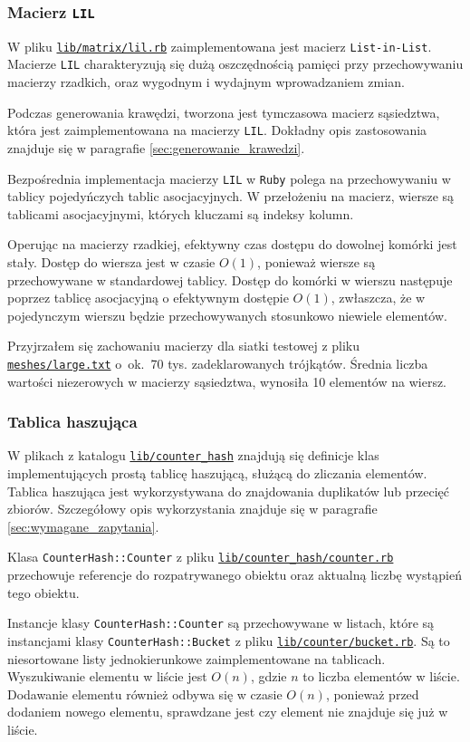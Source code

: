 \documentclass[10pt,a4paper]{article}
\newcommand{\f}[1]{\texttt{#1}}
\newcommand{\rev}{754330aa66a33e7434e6bda5c083aa3e12b7b65f}
\newcommand{\revhref}[1] {\href{https://github.com/student-tomasz/aisd-projekt-indywidualny/blob/\rev/#1}{\f{#1}}}
\begin{document}
\subsubsection{Macierz \f{LIL}}
\label{sec:macierz_lil}

W pliku \revhref{lib/matrix/lil.rb} zaimplementowana jest macierz
\f{List-in-List}. Macierze \f{LIL} charakteryzują się dużą oszczędnością
pamięci przy przechowywaniu macierzy rzadkich, oraz wygodnym i wydajnym
wprowadzaniem zmian.

Podczas generowania krawędzi, tworzona jest tymczasowa macierz sąsiedztwa,
która jest zaimplementowana na macierzy \f{LIL}. Dokładny opis zastosowania
znajduje się w paragrafie \ref{sec:generowanie_krawedzi}.

Bezpośrednia implementacja macierzy \f{LIL} w \f{Ruby} polega na
przechowywaniu w tablicy pojedyńczych tablic asocjacyjnych. W przełożeniu na
macierz, wiersze są tablicami asocjacyjnymi, których kluczami są indeksy
kolumn.

Operując na macierzy rzadkiej, efektywny czas dostępu do dowolnej komórki jest
stały. Dostęp do wiersza jest w czasie $O(1)$, ponieważ wiersze są
przechowywane w standardowej tablicy. Dostęp do komórki w wierszu następuje
poprzez tablicę asocjacyjną o efektywnym dostępie $O(1)$, zwłaszcza, że w
pojedynczym wierszu będzie przechowywanych stosunkowo niewiele elementów.

Przyjrzałem się zachowaniu macierzy dla siatki testowej z pliku
\revhref{meshes/large.txt} o~ok.~70 tys. zadeklarowanych trójkątów. Średnia
liczba wartości niezerowych w macierzy sąsiedztwa, wynosiła 10 elementów na
wiersz.

\subsubsection{Tablica haszująca}
\label{sec:tablica_haszujaca}

W plikach z katalogu \revhref{lib/counter\_hash} znajdują się definicje klas
implementujących prostą tablicę haszującą, służącą do zliczania elementów.
Tablica haszująca jest wykorzystywana do znajdowania duplikatów lub przecięć
zbiorów. Szczegółowy opis wykorzystania znajduje się w paragrafie
\ref{sec:wymagane_zapytania}.

Klasa \f{CounterHash::Counter} z pliku \revhref{lib/counter\_hash/counter.rb}
przechowuje referencje do rozpatrywanego obiektu oraz aktualną liczbę wystąpień
tego obiektu.

Instancje klasy \f{CounterHash::Counter} są przechowywane w listach, które są
instancjami klasy \f{CounterHash::Bucket} z pliku
\revhref{lib/counter/bucket.rb}. Są to niesortowane listy jednokierunkowe
zaimplementowane na tablicach. Wyszukiwanie elementu w liście jest $O(n)$,
gdzie $n$ to liczba elementów w liście. Dodawanie elementu również odbywa się
w czasie $O(n)$, ponieważ przed dodaniem nowego elementu, sprawdzane jest czy
element nie znajduje się już w liście.
\end{document}
